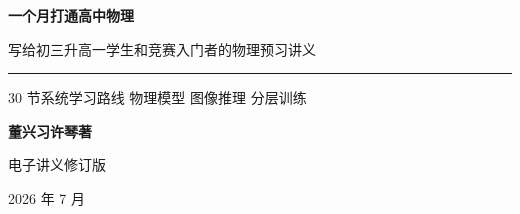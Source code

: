 \begin{titlepage}
\thispagestyle{empty}
\begin{center}
\vspace*{0.14\textheight}

{\bfseries 一个月打通高中物理\par}

\vspace{1.0cm}

{写给初三升高一学生和竞赛入门者的物理预习讲义\par}

\vspace{1.4cm}

\rule{0.68\textwidth}{0.8pt}

\vspace{0.8cm}

{\large
30 节系统学习路线\quad
物理模型\quad
图像推理\quad
分层训练
\par}

\vfill

{\bfseries 董兴习\quad 许琴\quad 著\par}

\vspace{1.4cm}

{\large 电子讲义修订版\par}

\vspace{0.5cm}

{\small 2026 年 7 月\par}
\end{center}
\end{titlepage}
